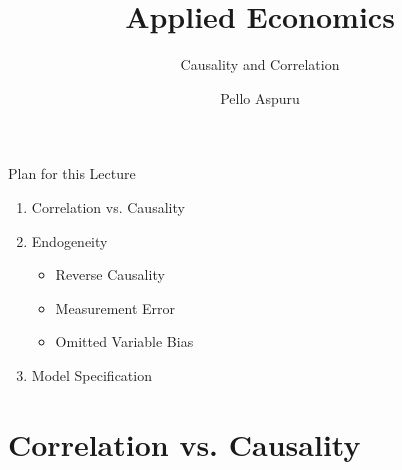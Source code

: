 \documentclass[11pt, aspectratio = 169]{beamer}
\title{Applied Economics}
\subtitle{Causality and Correlation}
\author{Pello Aspuru}
\date{}
\institute{Winter 2025/26}
\begin{document}
%

\maketitle

\begin{frame}{Plan for this Lecture}
\begin{enumerate}

\item Correlation vs. Causality
\item Endogeneity
\begin{itemize}
    \item Reverse Causality
    \item Measurement Error
    \item Omitted Variable Bias
\end{itemize}
\item Model Specification

\end{enumerate}
\end{frame}

\section{Correlation vs. Causality}
\end{document}
